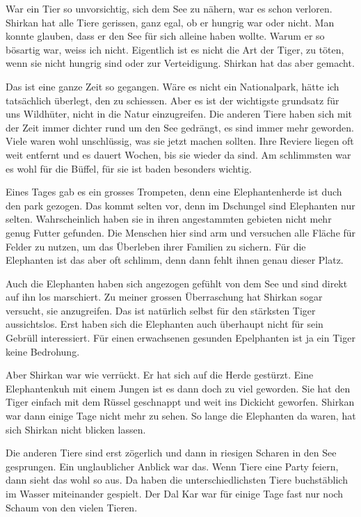 War ein Tier so unvorsichtig, sich dem See zu nähern, war es schon verloren. Shirkan hat alle Tiere gerissen, ganz egal, ob er hungrig war oder nicht. Man konnte glauben, dass er den See für sich alleine haben wollte. Warum er so bösartig war, weiss ich nicht. Eigentlich ist es nicht die Art der Tiger, zu töten, wenn sie nicht hungrig sind oder zur Verteidigung. Shirkan hat das aber gemacht.

Das ist eine ganze Zeit so gegangen. Wäre es nicht ein Nationalpark, hätte ich tatsächlich überlegt, den zu schiessen. Aber es ist der wichtigste grundsatz für uns Wildhüter, nicht in die Natur einzugreifen. Die anderen Tiere haben sich mit der Zeit immer dichter rund um den See gedrängt, es sind immer mehr geworden. Viele waren wohl unschlüssig, was sie jetzt machen sollten. Ihre Reviere liegen oft weit entfernt und es dauert Wochen, bis sie wieder da sind.  Am schlimmsten war es wohl für die Büffel, für sie ist baden besonders wichtig.

Eines Tages gab es ein grosses Trompeten, denn eine Elephantenherde ist duch den park gezogen. Das kommt selten vor, denn im Dschungel sind Elephanten nur selten. Wahrscheinlich haben sie in ihren angestammten gebieten nicht mehr genug Futter gefunden. Die Menschen hier sind arm und versuchen alle Fläche für Felder zu nutzen, um das Überleben ihrer Familien zu sichern. Für die Elephanten ist das aber oft schlimm, denn dann fehlt ihnen genau dieser Platz.

Auch die Elephanten haben sich angezogen gefühlt von dem See und sind direkt auf ihn los marschiert. Zu meiner grossen Überraschung hat Shirkan sogar versucht, sie anzugreifen. Das ist natürlich selbst für den stärksten Tiger aussichtslos. Erst haben sich die Elephanten auch überhaupt nicht für sein Gebrüll interessiert. Für einen erwachsenen gesunden Epelphanten ist ja ein Tiger keine Bedrohung. 

Aber Shirkan war wie verrückt. Er hat sich auf die Herde gestürzt. Eine Elephantenkuh mit einem Jungen ist es dann doch zu viel geworden. Sie hat den Tiger einfach mit dem Rüssel geschnappt und weit ins Dickicht geworfen. Shirkan war dann einige Tage nicht mehr zu sehen. So lange die Elephanten da waren, hat sich Shirkan nicht blicken lassen.

Die anderen Tiere sind erst zögerlich und dann in riesigen Scharen in den See gesprungen. Ein unglaublicher Anblick war das. Wenn Tiere eine Party feiern, dann sieht das wohl so aus. Da haben die unterschiedlichsten Tiere buchstäblich im Wasser miteinander gespielt. Der Dal Kar war für einige Tage fast nur noch Schaum von den vielen Tieren.

